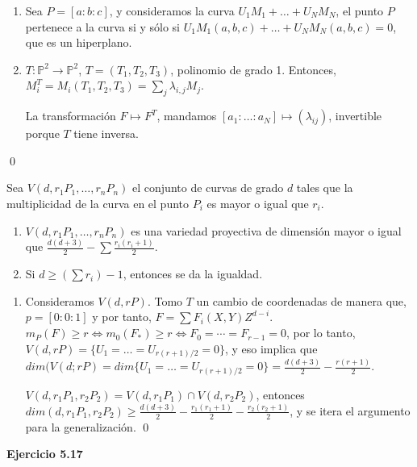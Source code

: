 \begin{Dem}
\begin{enumerate}
\item Sea $P=[a:b:c]$, y consideramos la curva $U_1M_1+\dots + U_NM_N$, el punto $P$ pertenece a la curva si y sólo si $U_1M_1(a,b,c)+\dots + U_NM_N(a,b,c) = 0$, que es un hiperplano. 

\item $T:\mathbb{P}^2\rightarrow \mathbb{P}^2$, $T=(T_1,T_2,T_3)$, polinomio de grado 1. Entonces, $M_i^T=M_i(T_1,T_2,T_3)=\sum_j \lambda_{i,j} M_j$. 

La transformación $F\mapsto F^T$, mandamos $[a_1:\dots : a_N]\mapsto (\lambda_{ij})$, invertible porque $T$ tiene inversa. 
\end{enumerate}
\qed
\end{Dem}

Sea $V(d,r_1P_1,\dots , r_nP_n)$ el conjunto de curvas de grado $d$ tales que la multiplicidad de la curva en el punto $P_i$ es mayor o igual que $r_i$. 

\begin{Teo}
\begin{enumerate}
\item $V(d,r_1P_1,\dots, r_nP_n)$ es una variedad proyectiva de dimensión mayor o igual que $\frac{d(d+3)}{2}-\sum \frac{r_i(r_i+1)}{2}$.
\item Si $d\ge ( \sum r_i)-1$, entonces se da la igualdad. 
\end{enumerate}
\end{Teo}

\begin{Dem}
\begin{enumerate}
\item Consideramos $V(d,rP)$. Tomo $T$ un cambio de coordenadas de manera que, $p=[0:0:1]$ y por tanto, $F=\sum F_i(X,Y)Z^{d-i}$. $m_P(F)\ge r \Leftrightarrow m_0(F_*)\ge r \Leftrightarrow F_0=\cdots =F_{r-1}=0$, por lo tanto, $V(d,rP)= \{U_1=\dots =U_{r(r+1)/2}=0 \}$, y eso implica que $dim(V(d;rP) = dim \{U_1=\dots =U_{r(r+1)/2}=0 \}=\frac{d(d+3)}{2}-\frac{r(r+1)}{2}$.

$V(d,r_1P_1,r_2P_2)=V(d,r_1P_1)\cap V(d,r_2P_2)$, entonces $dim(d,r_1P_1,r_2P_2)\ge \frac{d(d+3)}{2}-\frac{r_1(r_1+1)}{2}-\frac{r_2(r_2+1)}{2}$, y se itera el argumento para la generalización. \qed
\end{enumerate}
\end{Dem}

\textbf{Ejercicio 5.17}